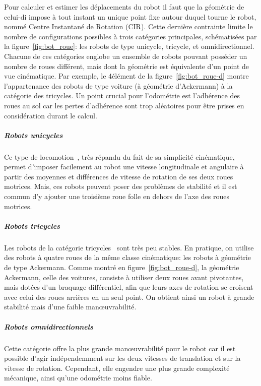                 Pour calculer et estimer les déplacements du robot il faut que la géométrie de celui-di impose à tout instant un unique point fixe autour duquel tourne le robot, nommé Centre Instantané de Rotation (CIR). Cette dernière contrainte limite le nombre de configurations possibles à trois catégories principales, schématisées par la figure~\ref{fig:bot_roue}: les robots de type unicycle, tricycle, et omnidirectionnel.
                Chacune de ces catégories englobe un ensemble de robots pouvant posséder un nombre de roues différent, mais dont la géométrie est équivalente d'un point de vue cinématique. Par exemple, le 4\ieme élément de la figure~\ref{fig:bot_roue-d} montre l'appartenance des robots de type voiture (à géométrie d'Ackermann) à la catégorie des tricycles. Un point crucial pour l'odométrie est l'adhérence des roues au sol car les pertes d'adhérence sont trop aléatoires pour être prises en considération durant le calcul.
                \subparagraph{Robots unicycles}
                    Ce type de locomotion~, très répandu du fait de sa simplicité cinématique, permet d'imposer facilement au robot une vitesse longitudinale et angulaire à partir des moyennes et différences de vitesse de rotation de ses deux roues motrices. Mais, ces robots peuvent poser des problèmes de stabilité et il est commun d'y ajouter une troisième roue folle en dehors de l'axe des roues motrices.
                \subparagraph{Robots tricycles}
                    Les robots de la catégorie tricycles~ sont très peu stables. En pratique, on utilise des robots à quatre roues de la même classe cinématique: les robots à géométrie de type Ackermann. Comme montré en figure~\ref{fig:bot_roue-d}, la géométrie Ackermann, celle des voitures, consiste à utiliser deux roues avant pivotantes, mais dotées d'un braquage différentiel, afin que leurs axes de rotation se croisent avec celui des roues arrières en un seul point. On obtient ainsi un robot à grande stabilité mais d'une faible manœuvrabilité.
                \subparagraph{Robots omnidirectionnels}
                    Cette catégorie offre la plus grande manœuvrabilité pour le robot car il est possible d'agir indépendemment sur les deux vitesses de translation et sur la vitesse de rotation. Cependant, elle engendre une plus grande complexité mécanique, ainsi qu'une odométrie moins fiable.
